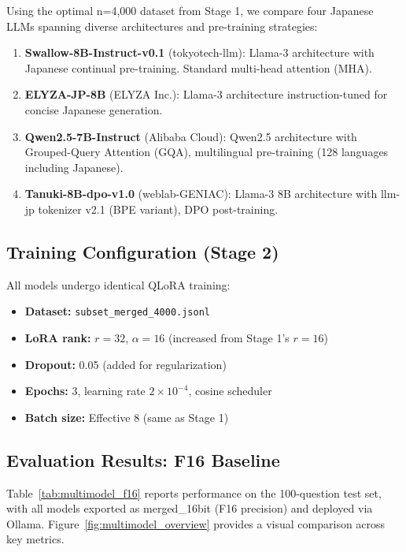 \documentclass[twocolumn]{article}
\begin{document}
Using the optimal n=4,000 dataset from Stage 1, we compare four Japanese LLMs spanning diverse
architectures and pre-training strategies:

\begin{enumerate}
  \item \textbf{Swallow-8B-Instruct-v0.1} (tokyotech-llm): Llama-3 architecture with Japanese
        continual pre-training. Standard multi-head attention (MHA).
  \item \textbf{ELYZA-JP-8B} (ELYZA Inc.): Llama-3 architecture instruction-tuned for concise
        Japanese generation.
  \item \textbf{Qwen2.5-7B-Instruct} (Alibaba Cloud): Qwen2.5 architecture with Grouped-Query
        Attention (GQA), multilingual pre-training (128 languages including Japanese).
  \item \textbf{Tanuki-8B-dpo-v1.0} (weblab-GENIAC): Llama-3 8B architecture with llm-jp
        tokenizer v2.1 (BPE variant), DPO post-training.
\end{enumerate}

\subsection{Training Configuration (Stage 2)}

All models undergo identical QLoRA training:
\begin{itemize}
  \item \textbf{Dataset:} \texttt{subset\_merged\_4000.jsonl}
  \item \textbf{LoRA rank:} $r = 32$, $\alpha = 16$ (increased from Stage 1's $r=16$)
  \item \textbf{Dropout:} 0.05 (added for regularization)
  \item \textbf{Epochs:} 3, learning rate $2 \times 10^{-4}$, cosine scheduler
  \item \textbf{Batch size:} Effective 8 (same as Stage 1)
\end{itemize}

\subsection{Evaluation Results: F16 Baseline}

Table~\ref{tab:multimodel_f16} reports performance on the 100-question test set, with all
models exported as merged\_16bit (F16 precision) and deployed via Ollama.
Figure~\ref{fig:multimodel_overview} provides a visual comparison across key metrics.
\end{document}
